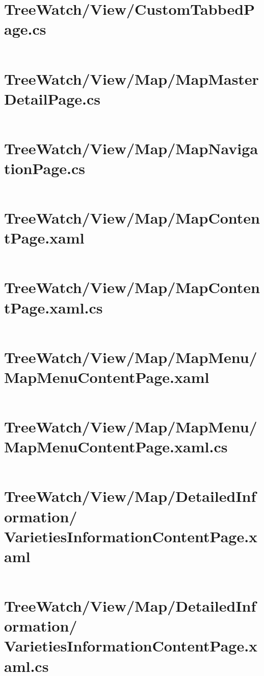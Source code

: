 \documentclass[12pt]{article}
\begin{document}
\tableofcontents
\clearpage


\section{TreeWatch/View/CustomTabbedPage.cs}
\inputminted[linenos,firstline=22]{csharp}{../../../src/TreeWatch/View/CustomTabbedPage.cs}
\section{TreeWatch/View/Map/MapMasterDetailPage.cs}
\inputminted[linenos,firstline=22]{csharp}{../../../src/TreeWatch/View/Map/MapMasterDetailPage.cs}
\section{TreeWatch/View/Map/MapNavigationPage.cs}
\inputminted[linenos,firstline=22]{csharp}{../../../src/TreeWatch/View/Map/MapNavigationPage.cs}
\section{TreeWatch/View/Map/MapContentPage.xaml}
\inputminted[linenos]{xml}{../../../src/TreeWatch/View/Map/MapContentPage.xaml}
\section{TreeWatch/View/Map/MapContentPage.xaml.cs}
\inputminted[linenos,firstline=22]{csharp}{../../../src/TreeWatch/View/Map/MapContentPage.xaml.cs}
\section{TreeWatch/View/Map/MapMenu/ MapMenuContentPage.xaml}
\inputminted[linenos]{xml}{../../../src/TreeWatch/View/Map/MapMenu/MapMenuContentPage.xaml}
\section{TreeWatch/View/Map/MapMenu/ MapMenuContentPage.xaml.cs}
\inputminted[linenos,firstline=22]{csharp}{../../../src/TreeWatch/View/Map/MapMenu/MapMenuContentPage.xaml.cs}
\section{TreeWatch/View/Map/DetailedInformation/ VarietiesInformationContentPage.xaml}
\inputminted[linenos]{xml}{../../../src/TreeWatch/View/Map/DetailedInformation/VarietiesInformationContentPage.xaml}
\section{TreeWatch/View/Map/DetailedInformation/ VarietiesInformationContentPage.xaml.cs}
\inputminted[linenos,firstline=22]{csharp}{../../../src/TreeWatch/View/Map/DetailedInformation/VarietiesInformationContentPage.xaml.cs}
\end{document}
